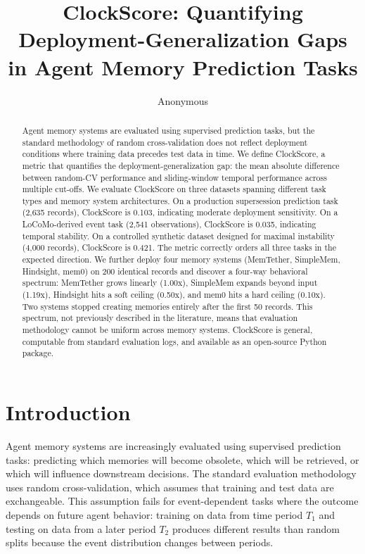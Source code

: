 \documentclass[sigconf,nonacm]{acmart}
\title{ClockScore: Quantifying Deployment-Generalization Gaps\\in Agent Memory Prediction Tasks}
\author{Anonymous}
\affiliation{\institution{Anonymous Institution}\city{Anonymous}\country{Anonymous}}
\begin{document}
\begin{abstract}
Agent memory systems are evaluated using supervised prediction tasks, but the standard methodology of random cross-validation does not reflect deployment conditions where training data precedes test data in time. We define ClockScore, a metric that quantifies the deployment-generalization gap: the mean absolute difference between random-CV performance and sliding-window temporal performance across multiple cut-offs. We evaluate ClockScore on three datasets spanning different task types and memory system architectures. On a production supersession prediction task (2,635 records), ClockScore is 0.103, indicating moderate deployment sensitivity. On a LoCoMo-derived event task (2,541 observations), ClockScore is 0.035, indicating temporal stability. On a controlled synthetic dataset designed for maximal instability (4,000 records), ClockScore is 0.421. The metric correctly orders all three tasks in the expected direction. We further deploy four memory systems (MemTether, SimpleMem, Hindsight, mem0) on 200 identical records and discover a four-way behavioral spectrum: MemTether grows linearly (1.00x), SimpleMem expands beyond input (1.19x), Hindsight hits a soft ceiling (0.50x), and mem0 hits a hard ceiling (0.10x). Two systems stopped creating memories entirely after the first 50 records. This spectrum, not previously described in the literature, means that evaluation methodology cannot be uniform across memory systems. ClockScore is general, computable from standard evaluation logs, and available as an open-source Python package.
\end{abstract}


\maketitle

\section{Introduction}
Agent memory systems are increasingly evaluated using supervised prediction tasks: predicting which memories will become obsolete, which will be retrieved, or which will influence downstream decisions. The standard evaluation methodology uses random cross-validation, which assumes that training and test data are exchangeable. This assumption fails for event-dependent tasks where the outcome depends on future agent behavior: training on data from time period $T_1$ and testing on data from a later period $T_2$ produces different results than random splits because the event distribution changes between periods.
\end{document}

